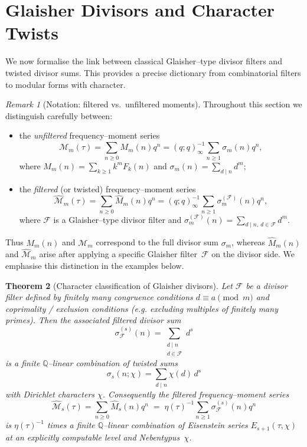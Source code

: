 \documentclass[11pt]{article}
\newtheorem{theorem}{Theorem}[section]
\theoremstyle{definition}
\theoremstyle{remark}
\newtheorem{remark}[theorem]{Remark}
\begin{document}
\section{Glaisher Divisors and Character Twists}\label{sec:glaisher}

We now formalise the link between classical Glaisher--type divisor filters
and twisted divisor sums.  This provides a precise dictionary from combinatorial
filters to modular forms with character.

\begin{remark}[Notation: filtered vs.\ unfiltered moments]\label{rem:filtered-unfiltered}
Throughout this section we distinguish carefully between:
\begin{itemize}
  \item the \emph{unfiltered} frequency--moment series
  \[
   \mathcal M_m(\tau)
  =\sum_{n\ge0} M_m(n)q^n
  =(q;q)_\infty^{-1}\sum_{n\ge1}\sigma_m(n)q^n,
  \]
  where
  \(
    M_m(n)=\sum_{k\ge1}k^mF_k(n)
  \)
  and
  \(
    \sigma_m(n)=\sum_{d\mid n}d^m;
  \)
  \item the \emph{filtered} (or twisted) frequency--moment series
  \[
    \widehat{\mathcal M}_m(\tau)
  =\sum_{n\ge0}\widehat{M}_m(n)q^n
  =(q;q)_\infty^{-1}\sum_{n\ge1}\sigma^{(\mathcal F)}_m(n)q^n,
  \]
  where $\mathcal F$ is a Glaisher--type divisor filter and
  \(
    \sigma^{(\mathcal F)}_m(n)=\sum_{d\mid n,\ d\in\mathcal F} d^m.
  \)
\end{itemize}
Thus $M_m(n)$ and $\mathcal M_m$ correspond to the full divisor sum
$\sigma_m$, whereas $\widehat{M}_m(n)$ and $\widehat{\mathcal M}_m$ arise
after applying a specific Glaisher filter~$\mathcal F$ on the divisor side.
We emphasise this distinction in the examples below.
\end{remark}

\begin{theorem}[Character classification of Glaisher divisors]\label{thm:glaisher}
Let $\mathcal F$ be a divisor filter defined by finitely many congruence
conditions $d\equiv a\pmod m$ and coprimality / exclusion conditions (e.g. excluding multiples of finitely many primes).
Then the associated filtered divisor sum
\[
\sigma^{(s)}_{\mathcal F}(n)=\sum_{\substack{d\mid n\\ d\in\mathcal F}} d^s
\]
is a finite $\mathbb{Q}$--linear combination of twisted sums
\[
\sigma_s(n;\chi)=\sum_{d\mid n}\chi(d)\,d^s
\]
with Dirichlet characters $\chi$. Consequently the filtered frequency--moment
series
\[
\widehat{\mathcal M}_s(\tau)
=\sum_{n\ge0} \widehat{M}_s(n)q^n
\;=\;\eta(\tau)^{-1}\sum_{n\ge1}\sigma^{(s)}_{\mathcal F}(n)q^n
\]
is $\eta(\tau)^{-1}$ times a finite $\mathbb{Q}$--linear combination
of Eisenstein series $E_{s+1}(\tau,\chi)$ at an explicitly computable
level and Nebentypus~$\chi$.
\end{theorem}
\end{document}

